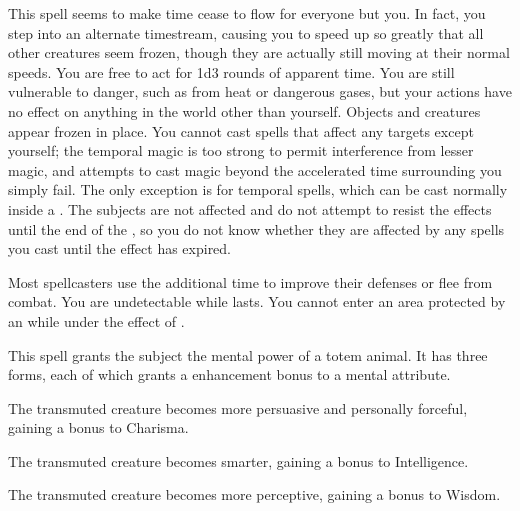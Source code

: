 \begin{spelleffect}
  This spell seems to make time cease to flow for everyone but you. In fact, you step into an alternate timestream, causing you to speed up so greatly that all other creatures seem frozen, though they are actually still moving at their normal speeds. You are free to act for 1d3 rounds of apparent time. You are still vulnerable to danger, such as from heat or dangerous gases, but your actions have no effect on anything in the world other than yourself. Objects and creatures appear frozen in place. You cannot cast spells that affect any targets except yourself; the temporal magic is too strong to permit interference from lesser magic, and attempts to cast magic beyond the accelerated time surrounding you simply fail. The only exception is for temporal spells, which can be cast normally inside a . The subjects are not affected and do not attempt to resist the effects until the end of the , so you do not know whether they are affected by any spells you cast until the effect has expired.
\end{spelleffect}
\begin{spellnotes}
  Most spellcasters use the additional time to improve their defenses or flee from combat. You are undetectable while  lasts. You cannot enter an area protected by an  while under the effect of .
\end{spellnotes}

\spellrng{\rngtouch}
\spelldur{\durshort}
\begin{spelleffect}
  This spell grants the subject the mental power of a totem animal. It has three forms, each of which grants a  enhancement bonus to a mental attribute.
  \par {} The transmuted creature becomes more persuasive and personally forceful, gaining a bonus to Charisma.
  \par {} The transmuted creature becomes smarter, gaining a bonus to Intelligence.
  \par {} The transmuted creature becomes more perceptive, gaining a bonus to Wisdom.
\end{spelleffect}

